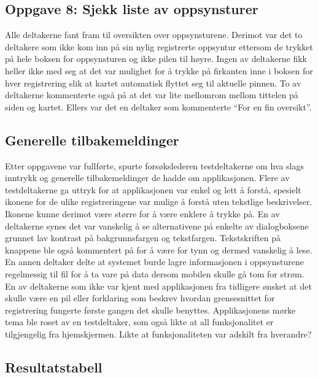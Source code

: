 \subsection{Oppgave 8: Sjekk liste av oppsynsturer}
Alle deltakerne fant fram til oversikten over oppsynsturene. Derimot var det to deltakere som ikke kom inn på sin nylig registrerte oppsyntur ettersom de trykket på hele boksen for oppsynsturen og ikke pilen til høyre. Ingen av deltakerne fikk heller ikke med seg at det var mulighet for å trykke på firkanten inne i boksen for hver registrering slik at kartet automatisk flyttet seg til aktuelle pinnen. To av deltakerne kommenterte også på at det var lite mellomrom mellom tittelen på siden og kartet. Ellers var det en deltaker som kommenterte \enquote{For en fin oversikt}. 

\subsection{Generelle tilbakemeldinger}
Etter oppgavene var fullførte, spurte forsøkslederen testdeltakerne om hva slags inntrykk og generelle tilbakemeldinger de hadde om applikasjonen. Flere av testdeltakerne ga uttryk for at applikasjonen var enkel og lett å forstå, spesielt ikonene for de ulike registreringene var mulige å forstå uten tekstlige beskrivelser. Ikonene kunne derimot være større for å være enklere å trykke på. En av deltakerne synes det var vanskelig å se alternativene på enkelte av dialogboksene grunnet lav kontrast på bakgrunnsfargen og tekstfargen. Tekstskriften på knappene ble også kommentert på for å være for tynn og dermed vanskelig å lese. En annen deltaker delte at systemet burde lagre informasjonen i oppsynsturene regelmessig til fil for å ta vare på data dersom mobilen skulle gå tom for strøm. En av deltakerne som ikke var kjent med applikasjonen fra tidligere ønsket at det skulle være en pil eller forklaring som beskrev hvordan grensesnittet for registrering fungerte første gangen det skulle benyttes. Applikasjonens mørke tema ble roset av en testdeltaker, som også likte at all funksjonalitet er tilgjengelig fra hjemskjermen. Likte at funksjonaliteten var adskilt fra hverandre? 

\subsection{Resultatstabell} \label{resultattabell}

